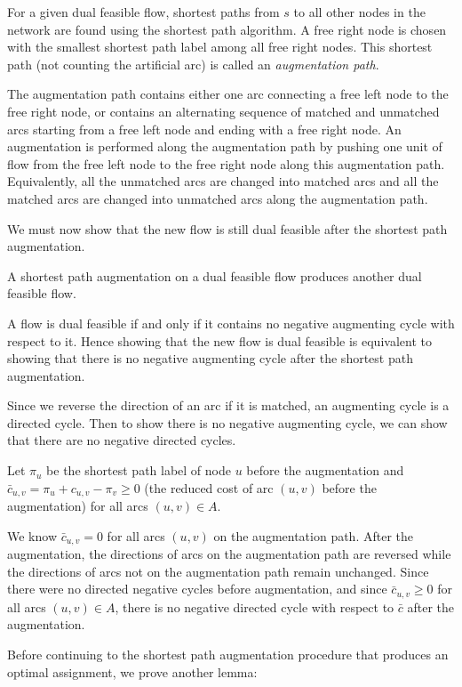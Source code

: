 For a given dual feasible flow, shortest paths from $s$ to all other
nodes in the network are found using the shortest path
algorithm.
A free right node is chosen with the smallest shortest path
label among all free right nodes. This shortest path (not counting the
artificial arc) is called an {\it augmentation path}.

The augmentation path contains either one arc connecting a free left
node to the free right node, or contains an alternating sequence of
matched and unmatched arcs starting from a free left node and ending
with a free right node. An augmentation is performed along the
augmentation path by pushing one unit of flow from the free left node
to the free right node along this augmentation path. Equivalently, all
the unmatched arcs are changed into matched arcs and all the matched
arcs are changed into unmatched arcs along the augmentation path.

We must now show that the new flow is still dual feasible after the
shortest path augmentation.

 A shortest path augmentation on a dual
feasible flow produces another dual feasible flow.

\proof A flow is dual feasible if and only if it contains no negative
augmenting cycle with respect to it. Hence showing that the new flow
is dual feasible is equivalent to showing that there is no negative
augmenting cycle after the shortest path augmentation.

Since we reverse the direction of an arc if it is matched, an
augmenting cycle is a directed cycle.  Then to show there is no
negative augmenting cycle, we can show that there are no negative
directed cycles.

Let $\pi_u$ be the shortest path label of node $u$ before the
augmentation and $\bar c_{u,v} = \pi_u +c_{u,v} - \pi_v\geq 0$ (the
reduced cost of arc $(u,v)$ before the augmentation) for all arcs
$(u,v)\in A$.

We know $\bar c_{u,v} = 0$ for all arcs $(u,v)$ on the augmentation
path. After the augmentation, the directions of arcs on the
augmentation path are reversed while the directions of arcs not on the
augmentation path remain unchanged. Since there were no directed
negative cycles before augmentation, and since $\bar c_{u,v}\geq 0 $
for all arcs $(u,v)\in A$, there is no negative directed cycle with
respect to $\bar c$ after the augmentation.  \bull

Before continuing to the shortest path augmentation procedure that
produces an optimal assignment, we prove another lemma:

